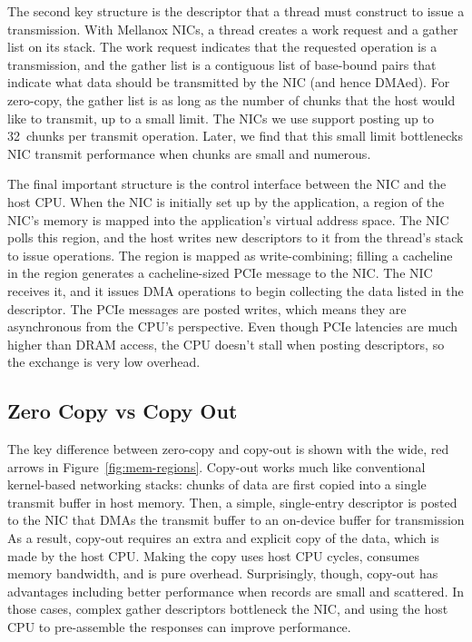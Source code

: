 The second key structure is the descriptor that a thread must construct to
issue a transmission. With Mellanox NICs, a thread creates a work request and a
gather list on its stack. The work request indicates that the requested
operation is a transmission, and the gather list is a contiguous list of
base-bound pairs that indicate what data should be transmitted by the NIC (and
hence DMAed). For zero-copy, the gather list is as long as the number of chunks
that the host would like to transmit, up to a small limit. The NICs we use support
posting up to 32~chunks per transmit operation. Later, we find that this small
limit bottlenecks NIC transmit performance when chunks are small and numerous.

The final important structure is the control interface between the NIC and the
host CPU.  When the NIC is initially set up by the application, a region of the
NIC's memory is mapped into the application's virtual address space. The NIC
polls this region, and the host writes new descriptors to it from the thread's
stack to issue operations. The region is mapped as write-combining; filling a
cacheline in the region generates a cacheline-sized PCIe message to the NIC.
The NIC receives it, and it issues DMA operations to begin collecting the data
listed in the descriptor. The PCIe messages are posted writes, which means they
are asynchronous from the CPU's perspective. Even though PCIe latencies are much
higher than DRAM access, the CPU doesn't stall when posting descriptors, so the
exchange is very low overhead.

\subsection{Zero Copy vs Copy Out}
The key difference between zero-copy and copy-out is shown with the wide, red
arrows in Figure~\ref{fig:mem-regions}. Copy-out works much like conventional
kernel-based networking stacks: chunks of data are first copied into a single
transmit buffer in host memory. Then, a simple, single-entry descriptor is
posted to the NIC that DMAs the transmit buffer to an on-device buffer for transmission
As a result, copy-out requires an extra and explicit copy of the data, which is made
by the host CPU.  Making the copy uses host CPU cycles, consumes memory
bandwidth, and is pure overhead. Surprisingly, though, copy-out has
advantages including better performance when
records are small and scattered.  In those cases, complex gather descriptors
bottleneck the NIC, and using the host CPU to pre-assemble the responses can
improve performance.



